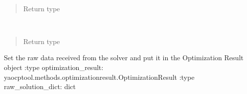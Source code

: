 \documentclass[letterpaper,10pt,english]{sphinxmanual}
\begin{document}
\begin{fulllineitems}

\begin{fulllineitems}
\label{\detokenize{yaocptool.methods.base:yaocptool.methods.base.discretizationschemebase.DiscretizationSchemeBase.model}}~\begin{quote}\begin{description}
\item[{Return type}] \leavevmode
{\hyperref[\detokenize{yaocptool.modelling:yaocptool.modelling.system_model.SystemModel}]{}}

\end{description}\end{quote}

\end{fulllineitems}


\begin{fulllineitems}
\label{\detokenize{yaocptool.methods.base:yaocptool.methods.base.discretizationschemebase.DiscretizationSchemeBase.problem}}~\begin{quote}\begin{description}
\item[{Return type}] \leavevmode
{\hyperref[\detokenize{yaocptool.modelling:yaocptool.modelling.ocp.OptimalControlProblem}]{}}

\end{description}\end{quote}

\end{fulllineitems}


\begin{fulllineitems}
\label{\detokenize{yaocptool.methods.base:yaocptool.methods.base.discretizationschemebase.DiscretizationSchemeBase.set_data_to_optimization_result_from_raw_data}}
Set the raw data received from the solver and put it in the Optimization Result object
:type optimization\_result: yaocptool.methods.optimizationresult.OptimizationResult
:type raw\_solution\_dict: dict


\end{fulllineitems}
\end{fulllineitems}
\end{document}

